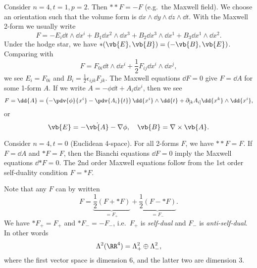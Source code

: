 \documentclass{jknotes}
\begin{document}
\begin{eg}
    Consider \(n=4,t=1,p=2\). Then \(**F=-F\) (e.g.\ the Maxwell field). We choose an orientation such that the volume form is \(\dd{x}\wedge\dd{y}\wedge\dd{z}\wedge\dd{t}\). With the Maxwell 2-form we usually write
    \begin{equation}
        F=-E_i\dd{t}\wedge\dd{x^i} + B_1\dd{x^2}\wedge\dd{x^3} + B_2\dd{x^3}\wedge\dd{x^1} + B_3 \dd{x^1}\wedge\dd{x^2}.
    \end{equation}
    Under the hodge star, we have \(*(\vb{E},\vb{B}) = (-\vb{B},\vb{E})\). Comparing with 
    \begin{equation}
        F=F_{0i}\dd{t}\wedge\dd{x^i} + \frac{1}{2}F_{ij}\dd{x^i}\wedge\dd{x^j},
    \end{equation}
    we see \(E_i = F_{0i}\) and \(B_i = \frac{1}{2}\epsilon_{ijk}F_{jk}\). The Maxwell equations \(\dd{F}=0\) give \(F=\dd{A}\) for some 1-form \(A\). If we write \(A = -\phi\dd{t} + A_i\dd{x^i}\), then we see
    \begin{equation}
        F=\dd{A} = \left(-\pdv{\phi}{x^i}-\pdv{A_i}{t}\right)\dd{x^i}\wedge\dd{t} + \partial_{[k}A_{i]}\dd{x^k}\wedge\dd{x^i},
    \end{equation}
    or
    \begin{equation}
        \vb{E} = -\dot{\vb{A}} - \nabla \phi,\quad \vb{B}=\nabla \times \vb{A}.
    \end{equation}
\end{eg}

\begin{eg}
    Consider \(n=4,t=0\) (Euclidean 4-space). For all 2-forms \(F\), we have \(**F=F\). If \(F=\dd{A}\) and \(*F=F\), then the Bianchi equations \(\dd{F}=0\) imply the Maxwell equations \(\dd{*F}=0\). The 2nd order Maxwell equations follow from the 1st order self-duality condition \(F=*F\).

    Note that any \(F\) can by written 
    \begin{equation}
        F = \underbrace{\frac{1}{2}(F+*F)}_{=F_+} + \underbrace{\frac{1}{2}(F-*F)}_{=F_-}.
    \end{equation}
    We have \(*F_+=F_+\) and \(*F_-=-F_-\), i.e.\ \(F_+\) is \emph{self-dual} and \(F_-\) is \emph{anti-self-dual}. In other words
    \begin{equation}
        \Lambda^2(\RR^4) = \Lambda^2_+ \oplus \Lambda^2_-,
    \end{equation}
    where the first vector space is dimension 6, and the latter two are dimension 3.
\end{eg}
\end{document}
